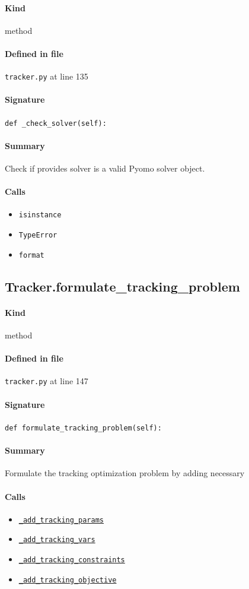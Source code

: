 \documentclass[11pt]{report}
\begin{document}
\paragraph{Kind} method
\paragraph{Defined in file} \texttt{tracker.py} at line 135
\paragraph{Signature} \texttt{def \_check\_solver(self):}
\paragraph{Summary} Check if provides solver is a valid Pyomo solver object.
\paragraph{Calls}
\begin{itemize}[leftmargin=*]
  \item \texttt{isinstance}
  \item \texttt{TypeError}
  \item \texttt{format}
\end{itemize}
\subsection{Tracker.formulate\_tracking\_problem}
\label{def:tracker.py:Tracker.formulate_tracking_problem:L147}
\paragraph{Kind} method
\paragraph{Defined in file} \texttt{tracker.py} at line 147
\paragraph{Signature} \texttt{def formulate\_tracking\_problem(self):}
\paragraph{Summary} Formulate the tracking optimization problem by adding necessary
\paragraph{Calls}
\begin{itemize}[leftmargin=*]
  \item \hyperref[def:tracker.py:Tracker._add_tracking_params:L187]{\texttt{\_add\_tracking\_params}}
  \item \hyperref[def:tracker.py:Tracker._add_tracking_vars:L166]{\texttt{\_add\_tracking\_vars}}
  \item \hyperref[def:tracker.py:Tracker._add_tracking_constraints:L219]{\texttt{\_add\_tracking\_constraints}}
  \item \hyperref[def:tracker.py:Tracker._add_tracking_objective:L244]{\texttt{\_add\_tracking\_objective}}
\end{itemize}
\end{document}
